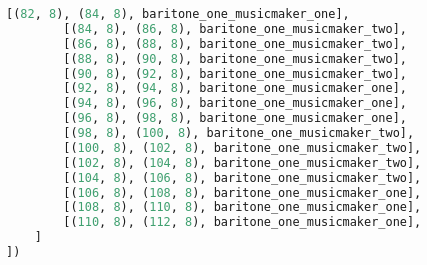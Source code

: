 \begin{lstlisting}[language=Python, caption=Invocation Source Code]
        [(82, 8), (84, 8), baritone_one_musicmaker_one],
        [(84, 8), (86, 8), baritone_one_musicmaker_two],
        [(86, 8), (88, 8), baritone_one_musicmaker_two],
        [(88, 8), (90, 8), baritone_one_musicmaker_two],
        [(90, 8), (92, 8), baritone_one_musicmaker_two],
        [(92, 8), (94, 8), baritone_one_musicmaker_one],
        [(94, 8), (96, 8), baritone_one_musicmaker_one],
        [(96, 8), (98, 8), baritone_one_musicmaker_one],
        [(98, 8), (100, 8), baritone_one_musicmaker_two],
        [(100, 8), (102, 8), baritone_one_musicmaker_two],
        [(102, 8), (104, 8), baritone_one_musicmaker_two],
        [(104, 8), (106, 8), baritone_one_musicmaker_two],
        [(106, 8), (108, 8), baritone_one_musicmaker_one],
        [(108, 8), (110, 8), baritone_one_musicmaker_one],
        [(110, 8), (112, 8), baritone_one_musicmaker_one],
    ]
])


\end{lstlisting}
